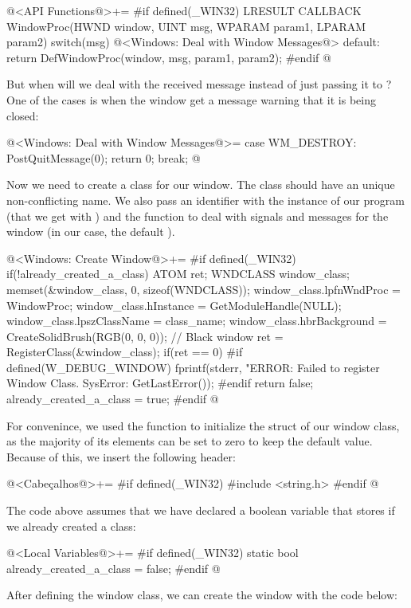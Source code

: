 \iniciocodigo
@<API Functions@>+=
#if defined(_WIN32)
LRESULT CALLBACK WindowProc(HWND window, UINT msg, WPARAM param1, LPARAM param2){
  switch(msg){
    @<Windows: Deal with Window Messages@>
    default:
      return DefWindowProc(window, msg, param1, param2);
  }
}
#endif
@
\fimcodigo

But when will we deal with the received message instead of just
passing it to ? One of the cases is when the
window get a message warning that it is being closed:

\iniciocodigo
@<Windows: Deal with Window Messages@>=
case WM_DESTROY:
  PostQuitMessage(0);
  return 0;
  break;
@
\fimcodigo

Now we need to create a class for our window. The class should have an
unique non-conflicting name. We also pass an identifier with the
instance of our program (that we get
with ) and the function to deal with
signals and messages for the window (in our case, the
default ).

\iniciocodigo
@<Windows: Create Window@>+=
#if defined(_WIN32)
if(!already_created_a_class){
  ATOM ret;
  WNDCLASS window_class;
  memset(&window_class, 0, sizeof(WNDCLASS));
  window_class.lpfnWndProc = WindowProc;
  window_class.hInstance = GetModuleHandle(NULL);
  window_class.lpszClassName = class_name;
  window_class.hbrBackground = CreateSolidBrush(RGB(0, 0, 0)); // Black window
  ret = RegisterClass(&window_class);
  if(ret == 0){
#if defined(W_DEBUG_WINDOW)
    fprintf(stderr, "ERROR: Failed to register Window Class. SysError: %
            GetLastError());
#endif
    return false;
  }
  already_created_a_class = true;
}
#endif
@
\fimcodigo

For convenince, we used the function  to initialize
the struct of our window class, as the majority of its elements can be
set to zero to keep the default value. Because of this, we insert the
following header:

\iniciocodigo
@<Cabeçalhos@>+=
#if defined(_WIN32)
#include <string.h>
#endif
@
\fimcodigo

The code above assumes that we have declared a boolean variable that
stores if we already created a class:

\iniciocodigo
@<Local Variables@>+=
#if defined(_WIN32)
static bool already_created_a_class = false;
#endif
@
\fimcodigo

After defining the window class, we can create the window with the
code below:


